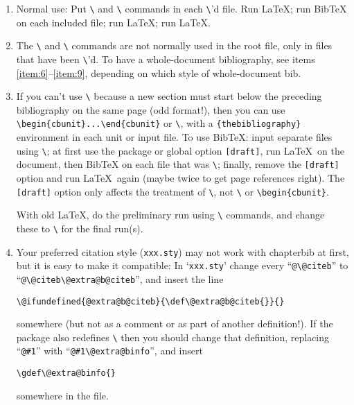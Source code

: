 \documentclass[DIV=9, pagesize=auto]{scrartcl}
\makeatletter
\newcommand*{\pkg}[1]{\textsf{#1}}
\newcommand*{\cs}[1]{\texttt{\textbackslash#1}}
\newcommand*{\cmd}[1]{\cs{\expandafter\@gobble\string#1}}
\newcommand*{\BibTeX}{Bib\kern-0.08em\TeX\@\xspace}
\def\BibTeX{BibTeX\xspace}%
\makeatother
\begin{document}
\begin{enumerate}
\item \label{item:1} Normal use: Put \cmd{} and \cmd{} commands in
  each \cmd{}'d file. Run \LaTeX; run \BibTeX on each included file;
  run \LaTeX; run \LaTeX.

\item The \cmd{} and \cmd{} commands are not normally used
  in the root file, only in files that have been \cmd{}'d. To have a
  whole-document bibliography, see items \ref{item:6}--\ref{item:9}, depending on which style of
  whole-document bib.

\item If you can't use \cmd{} because a new section must start below the
  preceding bibliography on the same page (odd format!), then you can
  use \verb+\begin{cbunit}+\allowbreak\texttt{...}\verb+\end{cbunit}+ or \cmd{\cbinput}, with a \verb+{thebibliography}+
  environment in each unit or input file.  To use \BibTeX: input separate
  files using \cmd{\cbinput}; at first use the package or global option \texttt{[draft]},
  run \LaTeX\ on the document, then \BibTeX on each file that was \cmd{\cbinput};
  finally, remove the \texttt{[draft]} option and run \LaTeX\ again (maybe twice to
  get page references right).  The \texttt{[draft]} option only affects the treatment
  of \cmd{\cbinput}, not \cmd{} or \verb+\begin{cbunit}+.
  
  With old \LaTeX, do the preliminary run using \cmd{} commands, and
  change these to \cmd{\cbinput} for the final run(s).

\item \label{item:4} Your preferred citation style (\texttt{xxx.sty}) may not work with \pkg{chapterbib} at
  first, but it is easy to make it compatible:  In `\texttt{xxx.sty}' change every
  ``\verb+@\@citeb+'' to ``\verb+@\@citeb\@extra@b@citeb+'', and insert the line
\begin{lstlisting}
\@ifundefined{@extra@b@citeb}{\def\@extra@b@citeb{}}{}
\end{lstlisting}
  somewhere (but not as a comment or as part of another definition!).
  If the package also redefines \cmd{\bibcite} then you should change that
  definition, replacing ``\verb+@#1+'' with ``\verb+@#1\@extra@binfo+'', and insert
\begin{lstlisting}
\gdef\@extra@binfo{}
\end{lstlisting}
  somewhere in the file.
  

\end{enumerate}
\end{document}
